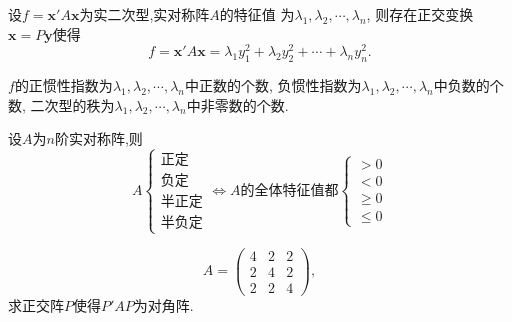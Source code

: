 \begin{deduction}
  设$f=\bm{x}'A\bm{x}$为实二次型,实对称阵$A$的特征值
  为$\lambda_1,\lambda_2,\cdots,\lambda_n$,
  则存在正交变换$\bm{x}=P\bm{y}$使得
  \[
  f = \bm{x}'A\bm{x} = \lambda_1y_1^2+\lambda_2y_2^2+\cdots+\lambda_ny_n^2.
  \]
  
  $f$的正惯性指数为$\lambda_1,\lambda_2,\cdots,\lambda_n$中正数的个数,
  负惯性指数为$\lambda_1,\lambda_2,\cdots,\lambda_n$中负数的个数,
  二次型的秩为$\lambda_1,\lambda_2,\cdots,\lambda_n$中非零数的个数.
\end{deduction}

\begin{deduction}
  设$A$为$n$阶实对称阵,则
  \[
  A\begin{cases}
    \text{正定}\\
    \text{负定}\\
    \text{半正定}\\
    \text{半负定}
  \end{cases} \Longleftrightarrow A\text{的全体特征值都} \begin{cases}
    >0\\
    <0\\
    \geq 0\\
    \leq 0
  \end{cases}
  \]
\end{deduction}

\begin{example}
  \[
  A=\begin{pmatrix}
    4 & 2 & 2\\
    2 & 4 & 2\\
    2 & 2 & 4
  \end{pmatrix},
  \]
  求正交阵$P$使得$P'AP$为对角阵.
\end{example}

